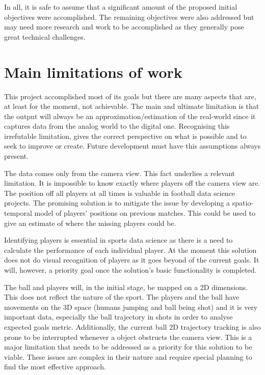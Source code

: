 \documentclass[
    11pt,
    oneside
]{report}
\begin{document}
In all, it is safe to assume that a significant amount of the proposed initial objectives were accomplished. The remaining objectives were also addressed but may need more research and work to be accomplished as they generally pose great technical challenges.


\section{Main limitations of work}


This project accomplished most of its goals but there are many aspects that are, at least for the moment, not achievable. The main and ultimate limitation is that the output will always be an approximation/estimation of the real-world since it captures data from the analog world to the digital one. Recognising this irrefutable limitation, gives the correct perspective on what is possible and to seek to improve or create. Future development must have this assumptions always present.


The data comes only from the camera view. This fact underlies a relevant limitation. It is impossible to know exactly where players off the camera view are. The position off all players at all times is valuable in football data science projects. The promising solution is to mitigate the issue by developing a spatio-temporal model of players' positions on previous matches. This could be used to give an estimate of where the missing players could be.


Identifying players is essential in sports data science as there is a need to calculate the performance of each individual player. At the moment this solution does not do visual recognition of players as it goes beyond of the current goals. It will, however, a priority goal once the solution's basic functionality is completed.


The ball and players will, in the initial stage, be mapped on a 2D dimensions. This does not reflect the nature of the sport. The players and the ball have movements on the 3D space (humans jumping and ball being shot) and it is very important data, especially the ball trajectory in shots in order to analyse expected goals metric. Additionally, the current ball 2D trajectory tracking is also prone to be interrupted whenever a object obstructs the camera view. This is a major limitation that needs to be addressed as a priority for this solution to be viable. These issues are complex in their nature and require special planning to find the most effective approach.
\end{document}

